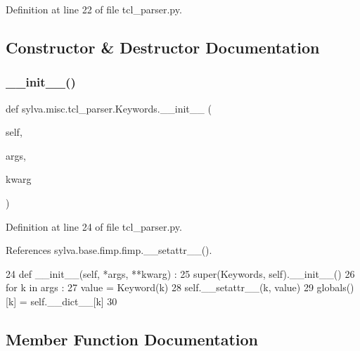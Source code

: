 Definition at line 22 of file tcl\+\_\+parser.\+py.



\subsection{Constructor \& Destructor Documentation}
\mbox{\label{classsylva_1_1misc_1_1tcl__parser_1_1_keywords_a4b7a15b3c0639416663e46d942c9b9be}} 
\subsubsection{\texorpdfstring{\+\_\+\+\_\+init\+\_\+\+\_\+()}{\_\_init\_\_()}}
{\footnotesize\ttfamily def sylva.\+misc.\+tcl\+\_\+parser.\+Keywords.\+\_\+\+\_\+init\+\_\+\+\_\+ (\begin{DoxyParamCaption}\item[{}]{self,  }\item[{}]{args,  }\item[{}]{kwarg }\end{DoxyParamCaption})}



Definition at line 24 of file tcl\+\_\+parser.\+py.



References sylva.\+base.\+fimp.\+fimp.\+\_\+\+\_\+setattr\+\_\+\+\_\+().


\begin{DoxyCode}
24     \textcolor{keyword}{def }\_\_init\_\_(self, *args, **kwarg) :
25       super(Keywords, self).\_\_init\_\_()
26       \textcolor{keywordflow}{for} k \textcolor{keywordflow}{in} args :
27         value = Keyword(k)
28         self.\_\_setattr\_\_(k, value)
29         globals()[k] = self.\_\_dict\_\_[k]
30 
\end{DoxyCode}


\subsection{Member Function Documentation}
\mbox{\label{classsylva_1_1misc_1_1tcl__parser_1_1_keywords_a0a9e148d0396587905bf17d93d3cac1a}} 
